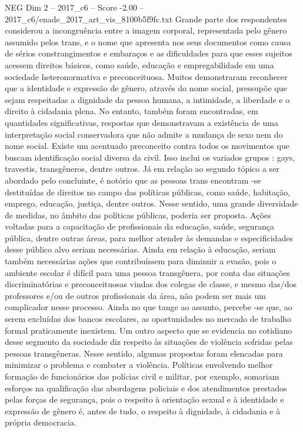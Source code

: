 \begin{textsample}{NEG Dim 2 – 2017\_c6 – Score -2.00 – 2017\_c6/enade\_2017\_art\_vis\_8100b5f9fc.txt}
Grande parte dos respondentes considerou a incongruência entre a imagem corporal, representada pelo gênero assumido pelos trans, e o nome que apresenta nos seus documentos como causa de sérios constrangimentos e embaraços e as dificuldades para que esses sujeitos acessem direitos básicos, como saúde, educação e empregabilidade em uma sociedade heteronormativa e preconceituosa.
Muitos demonstraram reconhecer que a identidade e expressão de gênero, através do nome social, pressupõe que sejam respeitadas a dignidade da pessoa humana, a intimidade, a liberdade e o direito à cidadania plena.
No entanto, também foram encontradas, em quantidades significativas, respostas que demonstravam a existência de uma interpretação social conservadora que não admite a mudança de sexo nem do nome social.
Existe um acentuado preconceito contra todos os movimentos que buscam identificação social diversa da civil.
Isso inclui os variados grupos : gays, travestis, transgêneros, dentre outros.
Já em relação ao segundo tópico a ser abordado pelo concluinte, é notório que as pessoas trans encontram -se destituídas de direitos no campo das políticas públicas, como saúde, habitação, emprego, educação, justiça, dentre outros.
Nesse sentido, uma grande diversidade de medidas, no âmbito das políticas públicas, poderia ser proposta.
Ações voltadas para a capacitação de profissionais da educação, saúde, segurança pública, dentre outras áreas, para melhor atender às demandas e especificidades desse público alvo seriam necessárias.
Ainda em relação à educação, seriam também necessárias ações que contribuíssem para diminuir a evasão, pois o ambiente escolar é difícil para uma pessoa transgênera, por conta das situações discriminatórias e preconceituosas vindas dos colegas de classe, e mesmo das/dos professores e/ou de outros profissionais da área, não podem ser mais um complicador nesse processo.
Ainda no que tange ao assunto, percebe -se que, ao serem excluídas dos bancos escolares, as oportunidades no mercado de trabalho formal praticamente inexistem.
Um outro aspecto que se evidencia no cotidiano desse segmento da sociedade diz respeito às situações de violência sofridas pelas pessoas transgêneras.
Nesse sentido, algumas propostas foram elencadas para minimizar o problema e combater a violência.
Políticas envolvendo melhor formação de funcionários das polícias civil e militar, por exemplo, somariam esforços na qualificação das abordagens policiais e dos atendimentos prestados pelas forças de segurança, pois o respeito à orientação sexual e à identidade e expressão de gênero é, antes de tudo, o respeito à dignidade, à cidadania e à própria democracia.

\end{textsample}
